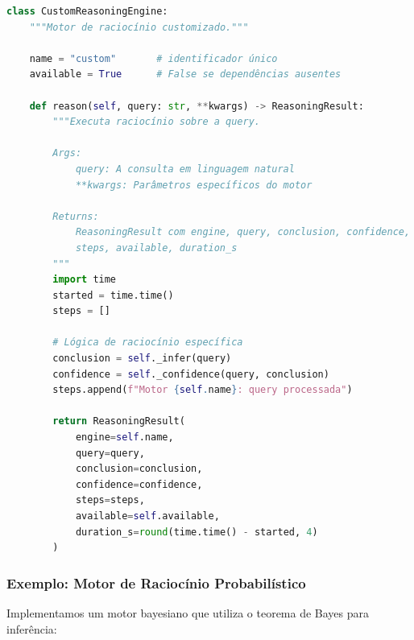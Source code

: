 \begin{lstlisting}[language=python,caption={Interface de motor de raciocínio},label={lst:reasoning-interface}]
class CustomReasoningEngine:
    """Motor de raciocínio customizado."""
    
    name = "custom"       # identificador único
    available = True      # False se dependências ausentes
    
    def reason(self, query: str, **kwargs) -> ReasoningResult:
        """Executa raciocínio sobre a query.
        
        Args:
            query: A consulta em linguagem natural
            **kwargs: Parâmetros específicos do motor
        
        Returns:
            ReasoningResult com engine, query, conclusion, confidence,
            steps, available, duration_s
        """
        import time
        started = time.time()
        steps = []
        
        # Lógica de raciocínio específica
        conclusion = self._infer(query)
        confidence = self._confidence(query, conclusion)
        steps.append(f"Motor {self.name}: query processada")
        
        return ReasoningResult(
            engine=self.name,
            query=query,
            conclusion=conclusion,
            confidence=confidence,
            steps=steps,
            available=self.available,
            duration_s=round(time.time() - started, 4)
        )
\end{lstlisting}

\subsubsection{Exemplo: Motor de Raciocínio Probabilístico}

Implementamos um motor bayesiano que utiliza o teorema de Bayes para inferência:

